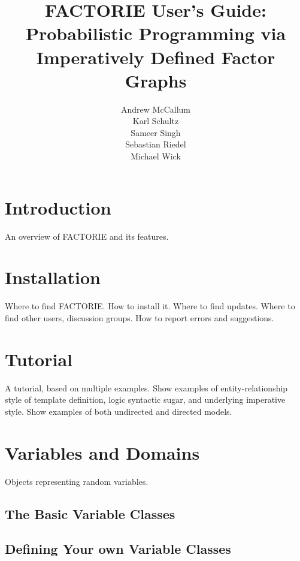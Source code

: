 \documentclass[]{manual}
\title{FACTORIE User's Guide:\\
Probabilistic Programming via Imperatively Defined Factor Graphs}
\author{Andrew McCallum \\ Karl Schultz \\ Sameer Singh \\ Sebastian Riedel \\ Michael Wick}
\begin{document}
\maketitle

\tableofcontents


\chapter{Introduction}
\label{chap:intro}

An overview of FACTORIE and its features.

\chapter{Installation}
\label{chap:install}

Where to find FACTORIE.  How to install it.  Where to find updates.
Where to find other users, discussion groups.  How to report errors
and suggestions.


\chapter{Tutorial}
\label{chap:tutorial}

A tutorial, based on multiple examples.  Show examples of
entity-relationship style of template definition, logic syntactic
sugar, and underlying imperative style.  Show examples of both
undirected and directed models.


\chapter{Variables and Domains}
\label{chap:variables}

Objects representing random variables.

\section{The Basic Variable Classes}
\section{Defining Your own Variable Classes}
\end{document}
